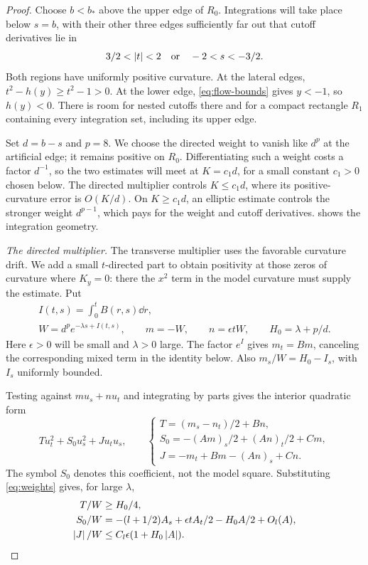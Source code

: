 \begin{proof}
Choose \(b<b_*\) above the upper edge of \(R_0\).
Integrations will take place below \(s=b\), with their other three
edges sufficiently far out that cutoff derivatives lie in
\[
3/2<\left\lvert t\right\rvert<2
\quad\text{or}\quad -2<s<-3/2.
\]
Both regions have uniformly positive curvature. At the lateral
edges, \(t^2-h(y)\ge t^2-1>0\). At the lower edge,
\eqref{eq:flow-bounds} gives \(y<-1\), so \(h(y)<0\).
There is room for nested cutoffs there and for a compact rectangle
\(R_1\) containing every integration set, including its upper edge.

Set \(d=b-s\) and \(p=8\). We choose the directed weight to vanish
like \(d^p\) at the artificial edge; it remains positive on \(R_0\).
Differentiating such a weight costs a factor \(d^{-1}\), so the
two estimates will meet at \(K=c_1d\), for a small constant
\(c_1>0\) chosen below. The directed multiplier controls
\(K\le c_1d\), where its positive-curvature error is
\(O(K/d)\). On \(K\ge c_1d\), an elliptic estimate controls
the stronger weight \(d^{p-1}\), which pays for the weight and
cutoff derivatives.  shows the integration geometry.



\smallskip
\noindent\emph{The directed multiplier.}
The transverse multiplier uses the favorable curvature drift.
We add a small \(t\)-directed part to obtain positivity at those
zeros of curvature where \(K_y=0\): there the \(x^2\) term in
the model curvature must supply the estimate.
Put
\begin{equation}\label{eq:weights}
\begin{gathered}
I(t,s)=\int_0^tB(r,s)\dd r,\\
W=d^p e^{-\lambda s+I(t,s)},\qquad
m=-W,\qquad n=\epsilon tW,\qquad H_0=\lambda+p/d .
\end{gathered}
\end{equation}
Here \(\epsilon>0\) will be small and \(\lambda>0\) large.
The factor \(e^I\) gives \(m_t=Bm\), canceling the corresponding
mixed term in the identity below. Also
\(m_s/W=H_0-I_s\), with \(I_s\) uniformly bounded.

Testing against \(mu_s+nu_t\) and integrating by parts gives
the interior quadratic form
\begin{equation}\label{eq:quadratic}
T u_t^2+S_0u_s^2+Ju_tu_s,
\qquad
\begin{cases}
T=(m_s-n_t)/2+Bn,\\
S_0=-(Am)_s/2+(An)_t/2+Cm,\\
J=-m_t+Bm-(An)_s+Cn.
\end{cases}
\end{equation}
The symbol \(S_0\) denotes this coefficient, not the model square.
Substituting \eqref{eq:weights} gives, for large \(\lambda\),
\begin{equation}\label{eq:quadratic-bounds}
\begin{aligned}
T/W&\ge H_0/4,\\
S_0/W&=-(l+1/2)A_s+\epsilon tA_t/2-H_0A/2+O_l(A),\\
\left\lvert J\right\rvert/W&\le C_l\epsilon(1+H_0\left\lvert A\right\rvert).
\end{aligned}
\end{equation}


\end{proof}
